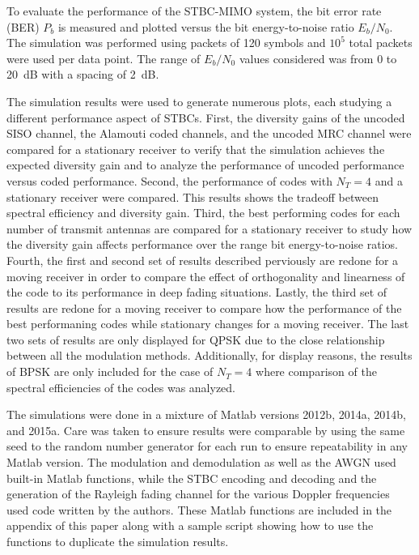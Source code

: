 To evaluate the performance of the STBC-MIMO system, the bit error rate (BER) $P_b$ is measured and plotted versus the bit energy-to-noise ratio $E_b/N_0$. The simulation was performed using packets of 120 symbols and $10^5$ total packets were used per data point. The range of $E_b/N_0$ values considered was from 0 to 20~dB with a spacing of 2~dB.

The simulation results were used to generate numerous plots, each studying a different performance aspect of STBCs. First, the diversity gains of the uncoded SISO channel, the Alamouti coded channels, and the uncoded MRC channel were compared for a stationary receiver to verify that the simulation achieves the expected diversity gain and to analyze the performance of uncoded performance versus coded performance. Second, the performance of codes with $N_T=4$ and a stationary receiver were compared. This results shows the tradeoff between spectral efficiency and diversity gain. Third, the best performing codes for each number of transmit antennas are compared for a stationary receiver to study how the diversity gain affects performance over the range bit energy-to-noise ratios. Fourth, the first and second set of results described perviously are redone for a moving receiver in order to compare the effect of orthogonality and linearness of the code to its performance in deep fading situations. Lastly, the third set of results are redone for a moving receiver to compare how the performance of the best performaning codes while stationary changes for a moving receiver. The last two sets of results are only displayed for QPSK due to the close relationship between all the modulation methods. Additionally, for display reasons, the results of BPSK are only included for the case of $N_T=4$ where comparison of the spectral efficiencies of the codes was analyzed.

The simulations were done in a mixture of Matlab versions 2012b, 2014a, 2014b, and 2015a. Care was taken to ensure results were comparable by using the same seed to the random number generator for each run to ensure repeatability in any Matlab version. The modulation and demodulation as well as the AWGN used built-in Matlab functions, while the STBC encoding and decoding and the generation of the Rayleigh fading channel for the various Doppler frequencies used code written by the authors. These Matlab functions are included in the appendix of this paper along with a sample script showing how to use the functions to duplicate the simulation results.